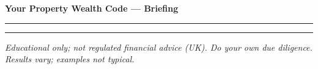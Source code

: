 \documentclass[a4paper,11pt]{article}
\begin{document}
{\Huge \textbf{Your Property Wealth Code — Briefing}}\par
{\color{textmuted}\rule{\linewidth}{0.6pt}}



\vspace{4pt}
{\color{textmuted}\rule{\linewidth}{0.4pt}}
{\footnotesize \textit{Educational only; not regulated financial advice (UK). Do your own due diligence. Results vary; examples not typical.}}
\end{document}
